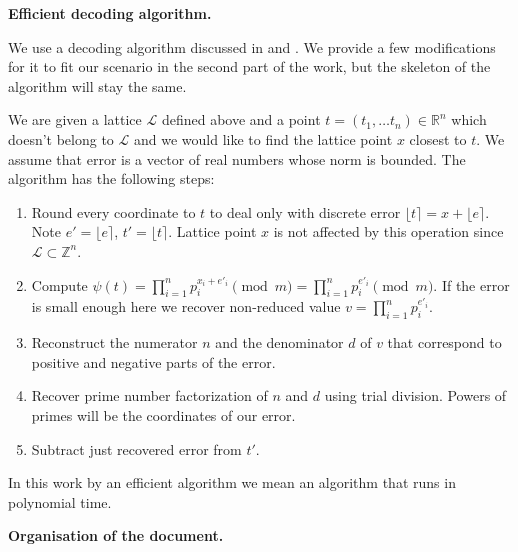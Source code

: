\documentclass[12pt]{article}
\newcommand{\ZZ}{\mathbb{Z}}
\newcommand{\LL}{\mathcal{L}}
\begin{document}
\textbf{Efficient decoding algorithm.}

We use a decoding algorithm discussed in \cite{[DP19]} and \cite{[LLXY17]}. We provide a few modifications for it to fit our scenario in the second part of the work, but the skeleton of the algorithm will stay the same.

We are given a lattice $\LL$ defined above and a point $t = (t_1, \dots t_n) \in \mathbb{R}^{n}$ which doesn't belong to $\LL$ and we would like to find the lattice point $x$ closest to $t$. We assume that error is a vector of real numbers whose norm is bounded. The algorithm has the following steps:

\begin{enumerate}
    \item Round every coordinate to $t$ to deal only with discrete error $\lfloor t \rceil = x + \lfloor e \rceil$. Note $e' = \lfloor e \rceil$, $t' = \lfloor t \rceil$. Lattice point $x$ is not affected by this operation since $\LL \subset \ZZ^{n}$.
    \item Compute $\psi(t) = \prod_{i=1}^{n}p_{i}^{x_{i} + e'_i} \pmod{m} = \prod_{i=1}^{n}p_{i}^{e'_i} \pmod{m}$. If the error is small enough here we recover non-reduced value $v = \prod_{i=1}^{n}p_{i}^{e'_i}$.
    \item Reconstruct the numerator $n$ and the denominator $d$ of $v$ that correspond to positive and negative parts of the error.
    \item Recover prime number factorization of $n$ and $d$ using trial division. Powers of primes will be the coordinates of our error.
    \item Subtract just recovered error from $t'$.
\end{enumerate}
In this work by an efficient algorithm we mean an algorithm that runs in polynomial time.

\textbf{Organisation of the document.}
\end{document}
